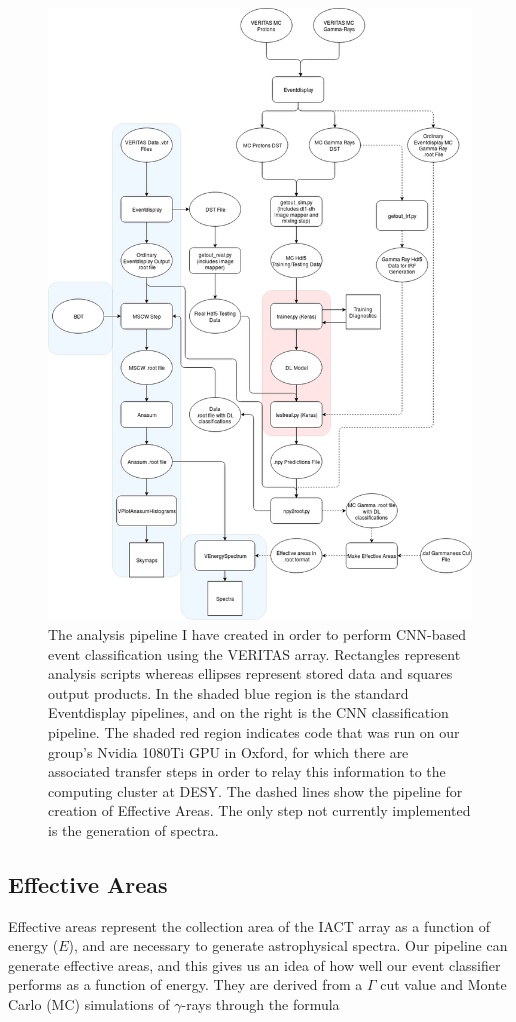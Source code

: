 \begin{figure}[t!] 
        \centering \includegraphics[width=0.83\columnwidth]{figures/Gettingout.png}

        \caption{
                \label{fig:Gettingout} The analysis pipeline I have created in order to perform CNN-based event classification using the VERITAS array. Rectangles represent analysis scripts whereas ellipses represent stored data and squares output products. In the shaded blue region is the standard Eventdisplay pipelines, and on the right is the CNN classification pipeline. The shaded red region indicates code that was run on our group's Nvidia 1080Ti GPU in Oxford, for which there are associated transfer steps in order to relay this information to the computing cluster at DESY. The dashed lines show the pipeline for creation of Effective Areas. The only step not currently implemented is the generation of spectra.
        }
\end{figure}

\subsection{Effective Areas}
 Effective areas represent the collection area of the IACT array as a function of energy ($E$), and are necessary to generate astrophysical spectra. Our pipeline can generate effective areas, and this gives us an idea of how well our event classifier performs as a function of energy.  They are derived from a $\Gamma$ cut value and Monte Carlo (MC) simulations of $\gamma$-rays through the formula

